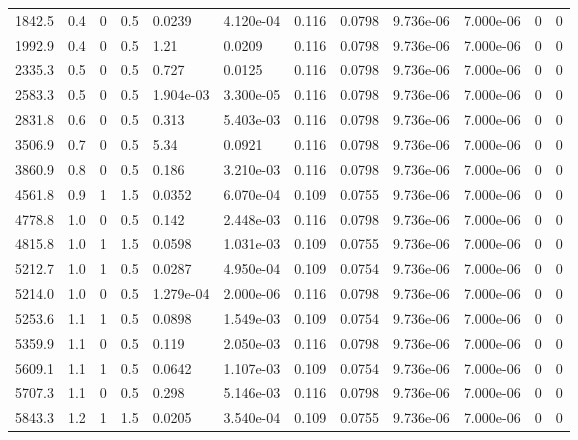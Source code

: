 \documentclass[preview]{standalone}
\begin{document}
{{\begin{tabular}{L{1.2cm}C{1.2cm} C{0.3cm}C{0.5cm} C{1.4cm}C{1.4cm} C{1.4cm}C{1.4cm} C{1.6cm}C{1.6cm} C{1.6cm}C{1.6cm}}
  1842.5  &   0.4  & 0     & 0.5 &  0.0239  & 4.120e-04  &  0.116&   0.0798& 9.736e-06 & 7.000e-06   &  0 & 0  \\ 
  1992.9  &   0.4  & 0     & 0.5 &  1.21  & 0.0209  &  0.116&   0.0798& 9.736e-06 & 7.000e-06   &  0 & 0  \\ 
  2335.3  &   0.5  & 0     & 0.5 &  0.727  & 0.0125  &  0.116&   0.0798& 9.736e-06 & 7.000e-06   &  0 & 0  \\ 
  2583.3  &   0.5  & 0     & 0.5 &  1.904e-03  & 3.300e-05  &  0.116&   0.0798& 9.736e-06 & 7.000e-06   &  0 & 0  \\ 
  2831.8  &   0.6  & 0     & 0.5 &  0.313  & 5.403e-03  &  0.116&   0.0798& 9.736e-06 & 7.000e-06   &  0 & 0  \\ 
  3506.9  &   0.7  & 0     & 0.5 &  5.34  & 0.0921  &  0.116&   0.0798& 9.736e-06 & 7.000e-06   &  0 & 0  \\ 
  3860.9  &   0.8  & 0     & 0.5 &  0.186  & 3.210e-03  &  0.116&   0.0798& 9.736e-06 & 7.000e-06   &  0 & 0  \\ 
  4561.8  &   0.9  & 1     & 1.5 &  0.0352  & 6.070e-04  &  0.109&   0.0755& 9.736e-06 & 7.000e-06   &  0 & 0  \\ 
  4778.8  &   1.0  & 0     & 0.5 &  0.142  & 2.448e-03  &  0.116&   0.0798& 9.736e-06 & 7.000e-06   &  0 & 0  \\ 
  4815.8  &   1.0  & 1     & 1.5 &  0.0598  & 1.031e-03  &  0.109&   0.0755& 9.736e-06 & 7.000e-06   &  0 & 0  \\ 
  5212.7  &   1.0  & 1     & 0.5 &  0.0287  & 4.950e-04  &  0.109&   0.0754& 9.736e-06 & 7.000e-06   &  0 & 0  \\ 
  5214.0  &   1.0  & 0     & 0.5 &  1.279e-04  & 2.000e-06  &  0.116&   0.0798& 9.736e-06 & 7.000e-06   &  0 & 0  \\ 
  5253.6  &   1.1  & 1     & 0.5 &  0.0898  & 1.549e-03  &  0.109&   0.0754& 9.736e-06 & 7.000e-06   &  0 & 0  \\ 
  5359.9  &   1.1  & 0     & 0.5 &  0.119  & 2.050e-03  &  0.116&   0.0798& 9.736e-06 & 7.000e-06   &  0 & 0  \\ 
  5609.1  &   1.1  & 1     & 0.5 &  0.0642  & 1.107e-03  &  0.109&   0.0754& 9.736e-06 & 7.000e-06   &  0 & 0  \\ 
  5707.3  &   1.1  & 0     & 0.5 &  0.298  & 5.146e-03  &  0.116&   0.0798& 9.736e-06 & 7.000e-06   &  0 & 0  \\ 
  5843.3  &   1.2  & 1     & 1.5 &  0.0205  & 3.540e-04  &  0.109&   0.0755& 9.736e-06 & 7.000e-06   &  0 & 0  \\ 

\end{tabular}}}
\end{document}
